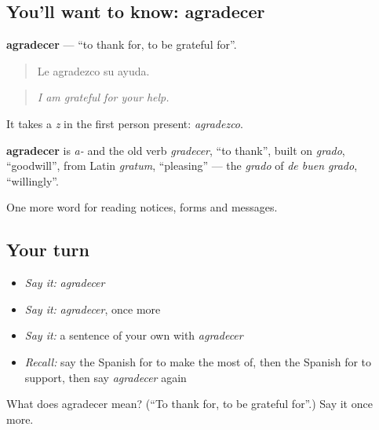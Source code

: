 \subsection*{You'll want to know: agradecer}
\textbf{agradecer} — \textquotedblleft{}to thank for, to be grateful for\textquotedblright{}.

\begin{quote}
Le agradezco su ayuda.
\end{quote}

\begin{quote}
\emph{I am grateful for your help.}
\end{quote}

It takes a \emph{z} in the first person present: \emph{agradezco}.

\begin{cousinweb}
\textbf{agradecer} is \emph{a-} and the old verb \emph{gradecer}, \textquotedblleft{}to thank\textquotedblright{}, built on \emph{grado}, \textquotedblleft{}goodwill\textquotedblright{}, from Latin \emph{gratum}, \textquotedblleft{}pleasing\textquotedblright{} — the \emph{grado} of \emph{de buen grado}, \textquotedblleft{}willingly\textquotedblright{}.
\end{cousinweb}

\begin{grammarlens}[title={What you've built}]
One more word for reading notices, forms and messages.
\end{grammarlens}

\subsection*{Your turn}
\begin{itemize}
\raggedright
  \item \emph{Say it:} \emph{agradecer}
  \item \emph{Say it:} \emph{agradecer}, once more
  \item \emph{Say it:} a sentence of your own with \emph{agradecer}
  \item \emph{Recall:} say the Spanish for to make the most of, then the Spanish for to support, then say \emph{agradecer} again
\end{itemize}

\begin{tcolorbox}[breakable,colback=teal!4,colframe=teal!35!black,title={Before you move on}]
What does agradecer mean? (\textquotedblleft{}To thank for, to be grateful for\textquotedblright{}.) Say it once more.
\end{tcolorbox}

